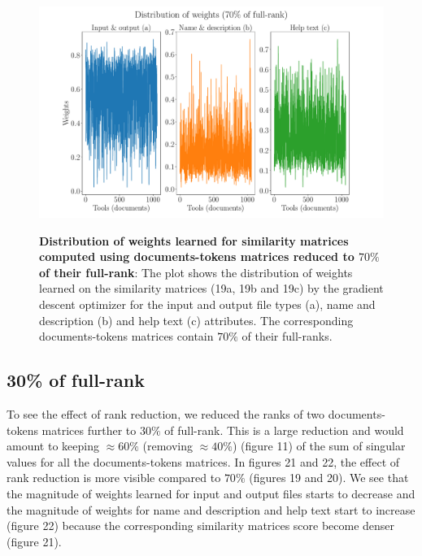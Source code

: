 \begin{figure}[h]
\begin{centering}
    {\includegraphics[scale=0.37]{figures/Weights_070.pdf}}
    \caption[Distribution of weights learned for similarity matrices computed using documents-tokens matrices reduced to $70\%$ of their full-rank]{\textbf{Distribution of weights learned for similarity matrices computed using documents-tokens matrices reduced to $70\%$ of their full-rank}: The plot shows the distribution of weights learned on the similarity matrices (19a, 19b and 19c) by the gradient descent optimizer for the input and output file types (a), name and description (b) and help text (c) attributes. The corresponding documents-tokens matrices contain $70\%$ of their full-ranks.}
\end{centering}
\end{figure}

\subsection{30\% of full-rank}
To see the effect of rank reduction, we reduced the ranks of two documents-tokens matrices further to $30\%$ of full-rank. This is a large reduction and would amount to keeping $\approx 60\%$ (removing $\approx 40\%$) (figure 11) of the sum of singular values for all the documents-tokens matrices. In figures 21 and 22, the effect of rank reduction is more visible compared to $70\%$ (figures 19 and 20). We see that the magnitude of weights learned for input and output files starts to decrease and the magnitude of weights for name and description and help text start to increase (figure 22) because the corresponding similarity matrices score become denser (figure 21).

